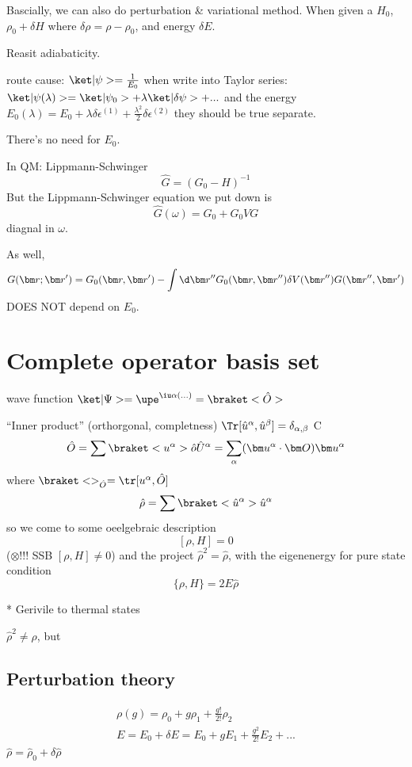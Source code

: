 Bascially, we can also do perturbation \& variational method.
When given a $H_0$, $\rho_0 + \delta H$
where $\delta\rho = \rho - \rho_0$, and energy $\delta  E$.

Reasit adiabaticity.

route cause: $\ket|\psi> = \frac1{E_0}$
when write into Taylor series: $\ket|\psi(\lambda)> = \ket|\psi_0> + \lambda\ket|\delta\psi> + ...$
and the energy
$E_0(\lambda) = E_0 + \lambda\delta \epsilon^{(1)} + \frac{\lambda^2}{2} \delta \epsilon^{(2)}$
they should be true separate.

There's no need for $E_0$.

In QM: Lippmann-Schwinger
\[
  \hat G = (G_0 - H)^{-1}
\]
But the Lippmann-Schwinger equation we put down is
\[
  \hat G(\omega) = G_0 + G_0VG
\]
diagnal in $\omega$.

As well,
\[
  G(\bm r;\bm r') = G_0(\bm r,\bm r')
- \int \d \bm r'' G_0 (\bm r, \bm r'') \delta V(\bm r'') G(\bm r'',\bm r')
\]
DOES NOT depend on $E_0$.

\section{Complete operator basis set}

wave function $\ket|\Psi> = \upe^{\iu\alpha (...)} = \braket<\hat O>$

``Inner product'' (orthorgonal, completness) $\Tr [\hat u^\alpha, \hat u^\beta] = \delta_{\alpha,\beta}$ C
\[
  \hat O = \sum \braket<u^\alpha>
  \hat o \hat U^\alpha = \sum_\alpha (\bm u^\alpha \cdot \bm O) \bm u^\alpha
\]
where $\braket<>_{\hat O} = \tr[u^\alpha, \hat O]$
\[
  \hat\rho = \sum \braket<\hat u^\alpha> \hat u^\alpha
\]
so we come to some oeelgebraic description
\[
  [\rho,H] = 0
\]
($\otimes$!!! SSB $[\rho, H] \neq 0$)
and the project $\hat \rho^2 = \hat \rho$, with the eigenenergy for pure state condition
\[
  \{\rho, H\} = 2E\hat \rho
\]

* Gerivile to thermal states

$\hat \rho^2 \neq \rho$, but

\subsection{Perturbation theory}

\begin{gather}
  \rho(g) = \rho_0 + g\rho_1 + \frac{g!}{2!}\rho_2\\
  E = E_0 + \delta E = E_0 + gE_1 + \frac{g^2}{2!}E_2 + ...
\end{gather}
$\hat\rho = \hat\rho_0 + \delta\hat\rho$

